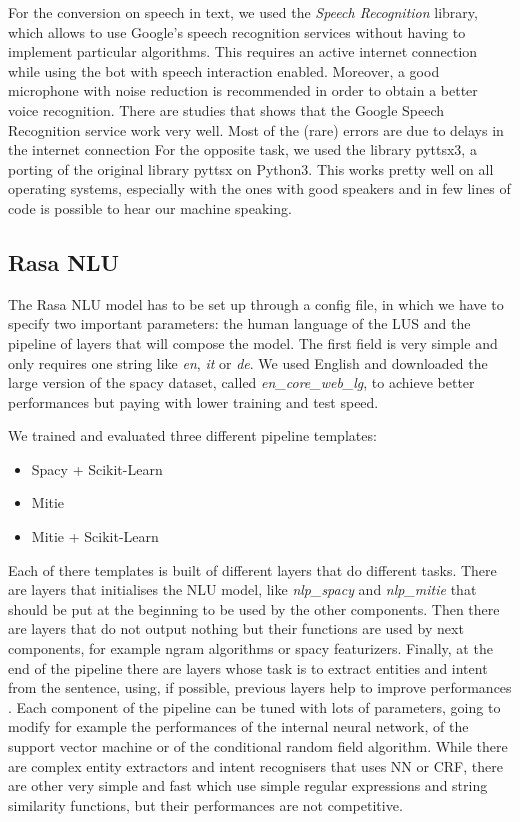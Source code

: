 \documentclass[11pt,a4paper]{article}
\begin{document}
For the conversion on speech in text, we used the \textit{Speech Recognition} library, which allows to use Google's speech recognition services without having to implement particular algorithms. This requires an active internet connection while using the bot with speech interaction enabled. Moreover, a good microphone with noise reduction is recommended in order to obtain a better voice recognition.
There are studies that shows that the Google Speech Recognition service work very well. Most of the (rare) errors are due to delays in the internet connection \cite{speech_study}
For the opposite task, we used the library pyttsx3, a porting of the original library pyttsx on Python3. This works pretty well on all operating systems, especially with the ones with good speakers and in few lines of code is possible to hear our machine speaking.

\subsection{Rasa NLU}

The Rasa NLU model has to be set up through a config file, in which we have to specify two important parameters: the human language of the LUS and the pipeline of layers that will compose the model. The first field is very simple and only requires one string like \textit{en}, \textit{it} or \textit{de}. We used English and downloaded the large version of the spacy dataset, called \textit{en\_core\_web\_lg}, to achieve better performances but paying with lower training and test speed.

We trained and evaluated three different pipeline templates: 
\begin{itemize}
\item Spacy + Scikit-Learn
\item Mitie
\item Mitie + Scikit-Learn
\end{itemize}

Each of there templates is built of different layers that do different tasks. There are layers that initialises the NLU model, like \textit{nlp\_spacy} and \textit{nlp\_mitie} that should be put at the beginning to be used by the other components. Then there are layers that do not output nothing but their functions are used by next components, for example ngram algorithms or spacy featurizers. Finally, at the end of the pipeline there are layers whose task is to extract entities and intent from the sentence, using, if possible, previous layers help to improve performances \cite{pipeline}.
Each component of the pipeline can be tuned with lots of parameters, going to modify for example the performances of the internal neural network, of the support vector machine or of the conditional random field algorithm. While there are complex entity extractors and intent recognisers that uses NN or CRF, there are other very simple and fast which use simple regular expressions and string similarity functions, but their performances are not competitive.
\end{document}
